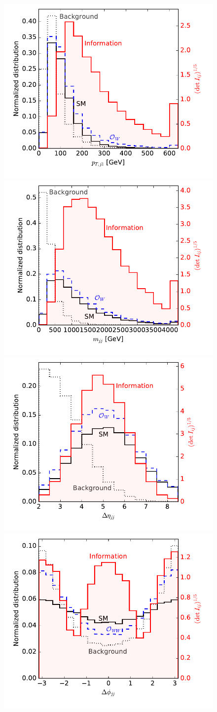 \begin{figure}
  \includegraphics[width=0.49 \textwidth]{fig/information/wbf_tautau_information_over_ptj}%
  \includegraphics[width=0.49 \textwidth]{fig/information/wbf_tautau_information_over_mjj}\\%
  \includegraphics[width=0.49 \textwidth]{fig/information/wbf_tautau_information_over_deltaeta}%
  \includegraphics[width=0.49 \textwidth]{fig/information/wbf_tautau_information_over_deltaphi}%

\end{figure}

